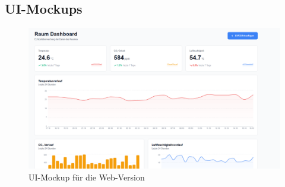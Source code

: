 \documentclass{article}
\begin{document}
\subsection{UI-Mockups}

\begin{figure}[H]
  \centering
  \includegraphics[width=\textwidth]{UI_Mockup_Web.png}
  \caption{UI-Mockup für die Web-Version}
  \label{fig:ui-mockup-web}
\end{figure}
\end{document}
